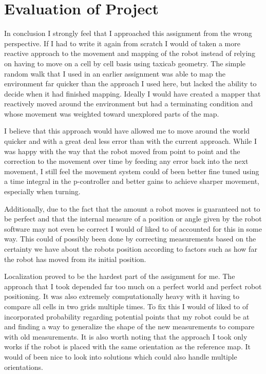 \documentclass{article}
\begin{document}
\section{Evaluation of Project}
In conclusion I strongly feel that I approached this assignment from the wrong perspective. If I had to write it again from scratch I would of taken a more reactive approach to the movement and mapping of the robot instead of relying on having to move on a cell by cell basis using taxicab geometry. The simple random walk that I used in an earlier assignment was able to map the environment far quicker than the approach I used here, but lacked the ability to decide when it had finished mapping. Ideally I would have created a mapper that reactively moved around the environment but had a terminating condition and whose movement was weighted toward unexplored parts of the map. 

I believe that this approach would have allowed me to move around the world quicker and with a great deal less error than with the current approach. While I was happy with the way that the robot moved from point to point and the correction to the movement over time by feeding any error back into the next movement, I still feel the movement system could of been better fine tuned using a time integral in the p-controller and better gains to achieve sharper movement, especially when turning.

Additionally, due to the fact that the amount a robot moves is guaranteed not to be perfect and that the internal measure of a position or angle given by the robot software may not even be correct I would of liked to of accounted for this in some way. This could of possibly been done by correcting measurements based on the certainty we have about the robots position according to factors such as how far the robot has moved from its initial position.

Localization proved to be the hardest part of the assignment for me. The approach that I took depended far too much on a perfect world and perfect robot positioning. It was also extremely computationally heavy with it having to compare all cells in two grids multiple times. To fix this I would of liked to of incorporated probability regarding potential points that my robot could be at and finding a way to generalize the shape of the new measurements to compare with old measurements. It is also worth noting that the approach I took only works if the robot is placed with the same orientation as the reference map. It would of been nice to look into solutions which could also handle multiple orientations.
\end{document}
